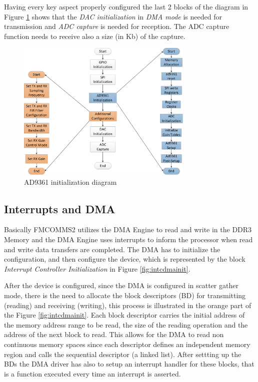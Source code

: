 Having every key aspect properly configured the last 2 blocks of the diagram in
Figure \ref{fig:ad9361init} shows that the \emph{DAC initialization} in
\textit{DMA mode} is needed for transmission and \emph{ADC capture} is needed
for reception. The ADC capture function needs to receive also a size (in Kb) of
the capture.


\begin{figure}[htbp]
    \centering
    \includegraphics[width=0.75\textwidth]{./figures/ad9361_driver}
    \caption{ AD9361 initialization diagram
    \label{fig:ad9361init}}
\end{figure}

\subsection{Interrupts and DMA}

Basically FMCOMMS2 utilizes the DMA Engine to read and write in the DDR3 Memory
and the DMA Engine uses interrupts to inform the processor when read and write
data transfers are completed. The DMA has to initialize the configuration, and
then configure the device, which is represented by the block \emph{Interrupt
Controller Initialization} in Figure \ref{fig:intcdmainit}.

After the device is configured, since the DMA is configured in scatter gather
mode, there is the need to allocate the block descriptors (BD) for transmitting
(reading) and receiving (writing), this process is illustrated in the orange
part of the Figure \ref{fig:intcdmainit}. Each block descriptor carries the
initial address of the memory address range to be read, the size of the reading
operation and the address of the next block to read. This allows for the DMA to
read non continuous memory spaces since each descriptor defines an independent
memory region and calls the sequential descriptor (a linked list). After
settting up the BDs the DMA driver has also to setup an interrupt handler for
these blocks, that is a function executed every time an interrupt is asserted.

